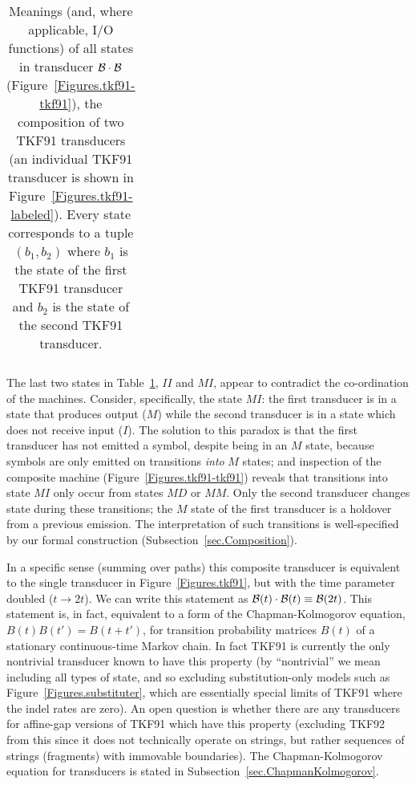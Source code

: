 \documentclass{article}
\newcommand{\secref}[1]{Subsection~\ref{sec.#1}}
\newcommand{\tabnum}[1]{\ref{tab.#1}}
\newcommand{\tabref}[1]{Table~\tabnum{#1}}
\newcommand{\tablabel}[1]{\label{tab.#1}}
\newcommand{\figref}[1]{Figure~\ref{Figures.#1}}
\newcommand\tkf{{\cal B}}
\begin{document}
\begin{table}
\begin{tabular}{c|p{}|p{}}
\end{tabular}
\caption{ \tablabel{tkf91-tkf91} Meanings (and, where applicable, I/O functions) of all states in
transducer $\tkf \cdot \tkf$ (\figref{tkf91-tkf91}),
the composition of two TKF91 transducers
(an individual TKF91 transducer is shown in \figref{tkf91-labeled}).
Every state corresponds to a tuple $(b_1,b_2)$
where
$b_1$ is the state of the first TKF91 transducer and
$b_2$ is the state of the second TKF91 transducer.
 }
\end{table}

The last two states in \tabref{tkf91-tkf91}, $II$ and $MI$, appear to contradict the co-ordination of the machines.
Consider, specifically, the state $MI$:
the first transducer is in a state that produces output ($M$)
while the second transducer is in a state which does not receive input ($I$).
The solution to this paradox is that the first transducer has not emitted a symbol, despite being in an $M$ state,
because symbols are only emitted on transitions {\em into} $M$ states;
and inspection of the composite machine (\figref{tkf91-tkf91}) reveals that transitions into state $MI$ only occur from states $MD$ or $MM$.
Only the second transducer changes state during these transitions; the $M$ state of the first transducer is a holdover from a previous emission.
The interpretation of such transitions is well-specified by our formal construction (\secref{Composition}).

In a specific sense (summing over paths)
this composite transducer is equivalent to the single transducer in \figref{tkf91},
but with the time parameter doubled ($t \to 2t$).
We can write this statement as $\tkf(t) \cdot \tkf(t) \equiv \tkf(2t)$.
This statement is, in fact, equivalent to a form of the Chapman-Kolmogorov equation,
$B(t)B(t') = B(t+t')$,
for transition probability matrices $B(t)$ of a stationary continuous-time Markov chain.
In fact TKF91 is currently the only nontrivial transducer known to have this property
(by ``nontrivial'' we mean including all types of state, and so excluding substitution-only models such as \figref{substituter},
which are essentially special limits of TKF91 where the indel rates are zero).
An open question is whether there are any transducers for affine-gap versions of TKF91 which
have this property
(excluding TKF92 from this since it does not technically operate on strings, but rather
sequences of strings (fragments) with immovable boundaries).  
The Chapman-Kolmogorov equation for transducers
is stated in \secref{ChapmanKolmogorov}.
\end{document}
